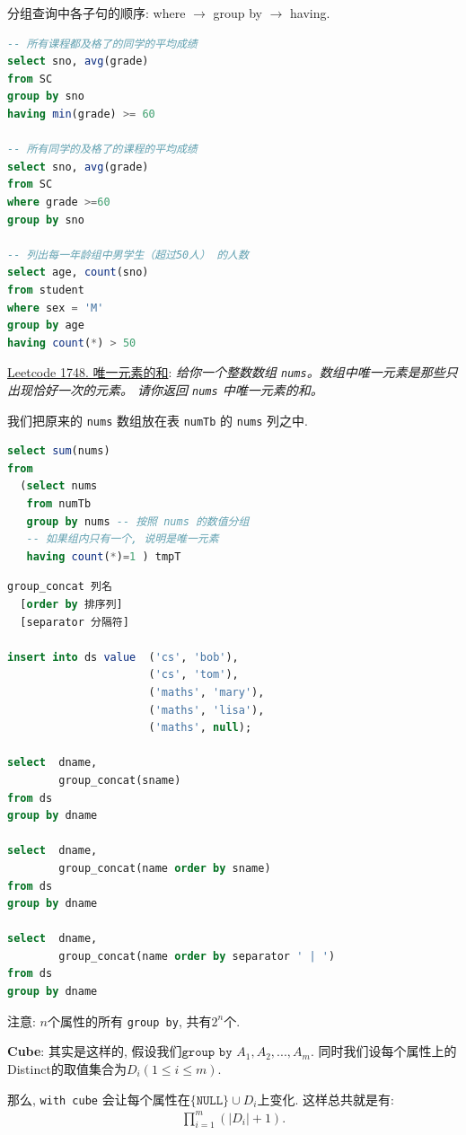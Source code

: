分组查询中各子句的顺序: where $\to$ group by $\to$ having.
\begin{lstlisting}[language=SQL]
-- 所有课程都及格了的同学的平均成绩
select sno, avg(grade)
from SC
group by sno
having min(grade) >= 60

-- 所有同学的及格了的课程的平均成绩
select sno, avg(grade)
from SC
where grade >=60
group by sno

-- 列出每一年龄组中男学生（超过50人） 的人数
select age, count(sno)
from student
where sex = 'M'
group by age
having count(*) > 50
\end{lstlisting}

\hyperlink{https://leetcode.cn/problems/sum-of-unique-elements/description/}{Leetcode 1748. 唯一元素的和}: \textit{给你一个整数数组 \texttt{nums}。数组中唯一元素是那些只出现恰好一次的元素。
请你返回 \texttt{nums} 中唯一元素的和。}

我们把原来的 \verb|nums| 数组放在表 \verb|numTb| 的 \verb|nums| 列之中.
\begin{lstlisting}[language=SQL]
select sum(nums)
from
  (select nums
   from numTb
   group by nums -- 按照 nums 的数值分组
   -- 如果组内只有一个, 说明是唯一元素
   having count(*)=1 ) tmpT
\end{lstlisting}


\begin{lstlisting}[language=SQL]
group_concat 列名
  [order by 排序列]
  [separator 分隔符]

insert into ds value  ('cs', 'bob'),
                      ('cs', 'tom'),
                      ('maths', 'mary'),
                      ('maths', 'lisa'),
                      ('maths', null);

select  dname,
        group_concat(sname)
from ds
group by dname

select  dname,
        group_concat(name order by sname)
from ds
group by dname

select  dname,
        group_concat(name order by separator ' | ')
from ds
group by dname
\end{lstlisting}

注意: $n$个属性的所有 \verb|group by|, 共有$2^n$个.

\textbf{Cube}: 其实是这样的, 假设我们$\texttt{group by }A_1,A_2,...,A_m$. 同时我们设每个属性上的Distinct的取值集合为$D_i(1\leq i\leq m)$.

那么, \verb|with cube| 会让每个属性在$\{\texttt{NULL}\}\cup D_i$上变化. 这样总共就是有:
\begin{align*}
    \prod_{i=1}^m (|D_i|+1).
\end{align*}

